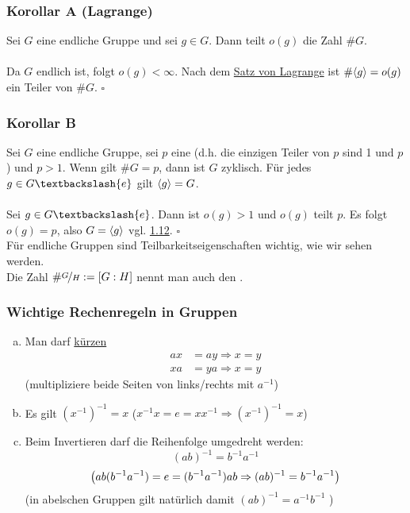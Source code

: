 \subsubsection*{Korollar A (Lagrange)}
Sei $G$ eine endliche Gruppe und sei $g\in G$. Dann teilt $o(g)$ die Zahl $\#G$.\\

\\
Da $G$ endlich ist, folgt $o(g)<\infty$. Nach dem \hyperref[sub:satz_von_lagrange]{Satz von Lagrange} ist $\#\langle g \rangle=o(g)$ ein Teiler von $\#G$.
\hfill $\square$

\subsubsection*{Korollar B}
Sei $G$ eine endliche Gruppe, sei $p$ eine   (d.h. die einzigen Teiler von $p$ sind 1 und $p$) und $p>1$. 
Wenn gilt $\#G=p$, dann ist $G$ zyklisch. 
Für jedes $g\in G \textbackslash\{e\}$ gilt $\langle g \rangle=G$.\\

\\
Sei $g \in G\textbackslash\{e\}$.
 Dann ist $o(g)>1$ und $o(g)$ teilt $p$. 
 Es folgt $o(g)=p$, also $G=\langle g \rangle$ vgl. \hyperref[sub:zyklische_gruppen]{1.12}.
\hfill $\square$\\

Für endliche Gruppen sind Teilbarkeitseigenschaften wichtig, wie wir sehen werden.\\
Die Zahl $\#\nicefrac{G}{H}:=[G:H]$ nennt man auch den .

\subsubsection*{Wichtige Rechenregeln in Gruppen}
\begin{enumerate}[(a)]
	\item Man darf \uline{kürzen}
	\begin{equation*}
	\begin{aligned}
		ax &= ay \Rightarrow x=y\\
		xa &= ya \Rightarrow x=y
	\end{aligned}
	\end{equation*}
	(multipliziere beide Seiten von links/rechts mit $a^{-1}$)
	\item Es gilt $(x^{-1})^{-1}=x$   ($x^{-1}x=e=xx^{-1} \Rightarrow (x^{-1})^{-1}=x$)
	\item Beim Invertieren darf die Reihenfolge umgedreht werden:\\
	\[
	(ab)^{-1}=b^{-1}a^{-1}
	\]
	\[
	\left( ab(b^{-1}a^{-1})=e=(b^{-1}a^{-1})ab \Rightarrow (ab)^{-1}=b^{-1}a^{-1}\right)
	\]
	(in abelschen Gruppen gilt natürlich damit $(ab)^{-1}=a^{-1}b^{-1}$ )
\end{enumerate}
